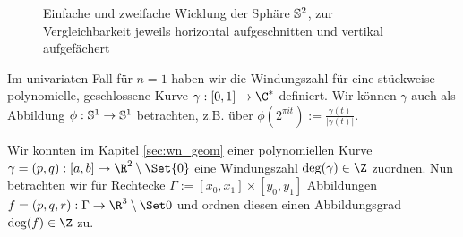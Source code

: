 \documentclass{mythesis}
\begin{document}
\begin{figure}[ht]
    \caption{Einfache und zweifache Wicklung der Sphäre $\S^2$, zur Vergleichbarkeit jeweils horizontal aufgeschnitten und vertikal aufgefächert}
    \label{fig:spherewinding}
\end{figure}

Im univariaten Fall für $n = 1$ haben wir die Windungszahl für eine stückweise polynomielle, geschlossene Kurve $\gamma: [0,1] \to \C^*$ definiert.
Wir können $\gamma$ auch als Abbildung $\phi: \S^1 \to \S^1$ betrachten, z.B. über $\phi(2^{\pi i t}) := \frac{\gamma(t)}{|\gamma(t)|}$.


Wir konnten im Kapitel \ref{sec:wn_geom} einer polynomiellen Kurve $\gamma = (p,q): [a,b] \to \R^2 \setminus \Set{0}$ eine Windungszahl $\deg(\gamma) \in \Z$ zuordnen.
Nun betrachten wir für Rechtecke $\Gamma := [x_0, x_1] \times [y_0, y_1]$ Abbildungen $f = (p,q,r): \Gamma \to \R^3 \setminus \Set 0$ und ordnen diesen einen Abbildungsgrad $\deg(f) \in \Z$ zu.

\end{document}
